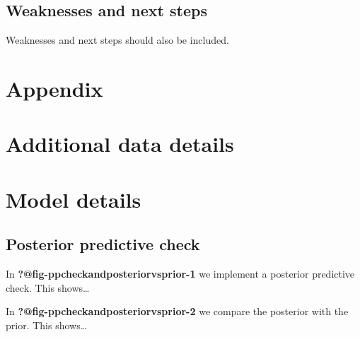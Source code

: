\documentclass[
  letterpaper,
  DIV=11,
  numbers=noendperiod]{scrartcl}
\begin{document}
\subsection{Weaknesses and next steps}\label{weaknesses-and-next-steps}

Weaknesses and next steps should also be included.

\newpage

\appendix

\section*{Appendix}\label{appendix}

\section{Additional data details}\label{additional-data-details}

\section{Model details}\label{sec-model-details}

\subsection{Posterior predictive
check}\label{posterior-predictive-check}

In \textbf{?@fig-ppcheckandposteriorvsprior-1} we implement a posterior
predictive check. This shows\ldots{}

In \textbf{?@fig-ppcheckandposteriorvsprior-2} we compare the posterior
with the prior. This shows\ldots{}
\end{document}
